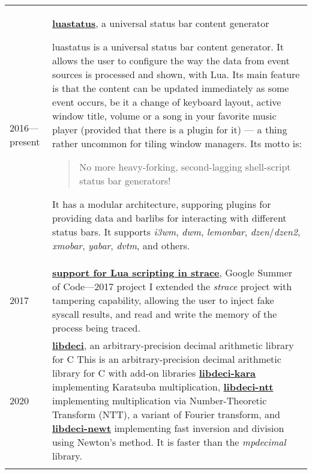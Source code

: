 \documentclass[10pt]{article}
\begin{document}
\begin{tabularx}{\textwidth}{ l X }
    2016---present & \href{https://github.com/shdown/luastatus}{\textbf{luastatus}}, a universal status bar content generator
    \newline
    \footnotesize{
        luastatus is a universal status bar content generator. It allows the user to configure the way the data from event sources is processed and shown, with Lua.
        Its main feature is that the content can be updated immediately as some event occurs, be it a change of keyboard layout, active window title, volume or a song in your favorite music player (provided that there is a plugin for it) — a thing rather uncommon for tiling window managers.
        Its motto is:
        \begin{quote}
        No more heavy-forking, second-lagging shell-script status bar generators!
        \end{quote}
        It has a modular architecture, supporing plugins for providing data and barlibs for interacting with different status bars.
        It supports \textit{i3wm}, \textit{dwm}, \textit{lemonbar}, \textit{dzen}/\textit{dzen2}, \textit{xmobar}, \textit{yabar}, \textit{dvtm}, and others.
    }
    \\
    \medskip

    2017 & \href{http://0x1.tv/img_auth.php/f/fe/Lua-\%D1\%81\%D0\%BA\%D1\%80\%D0\%B8\%D0\%BF\%D1\%82\%D0\%B8\%D0\%BD\%D0\%B3_\%D0\%B2_strace_\%28\%D0\%92\%D0\%B8\%D0\%BA\%D1\%82\%D0\%BE\%D1\%80_\%D0\%9A\%D1\%80\%D0\%B0\%D0\%BF\%D0\%B8\%D0\%B2\%D0\%B5\%D0\%BD\%D1\%81\%D0\%BA\%D0\%B8\%D0\%B9\%2C_OSSDEVCONF-2017\%29.pdf}{\textbf{support for Lua scripting in strace}}, Google Summer of Code---2017 project
    \newline
    \footnotesize{
        I extended the \textit{strace} project with tampering capability, allowing the user to inject fake syscall results, and read and write the memory of the process being traced.
    }
    \\
    \medskip

    2020 & \href{https://github.com/shdown/libdeci}{\textbf{libdeci}}, an arbitrary-precision decimal arithmetic library for C
    \newline
    \footnotesize{
        This is an arbitrary-precision decimal arithmetic library for C with add-on libraries
        \href{https://github.com/shdown/libdeci-kara}{\textbf{libdeci-kara}} implementing Karatsuba multiplication,
        \href{https://github.com/shdown/libdeci-ntt}{\textbf{libdeci-ntt}} implementing multiplication via Number-Theoretic Transform (NTT), a variant of Fourier transform,
        and \href{https://github.com/shdown/libdeci-newt}{\textbf{libdeci-newt}} implementing fast inversion and division using Newton's method.
        It is faster than the \textit{mpdecimal} library.
    }
    \\
    \medskip


\end{tabularx}
\end{document}
